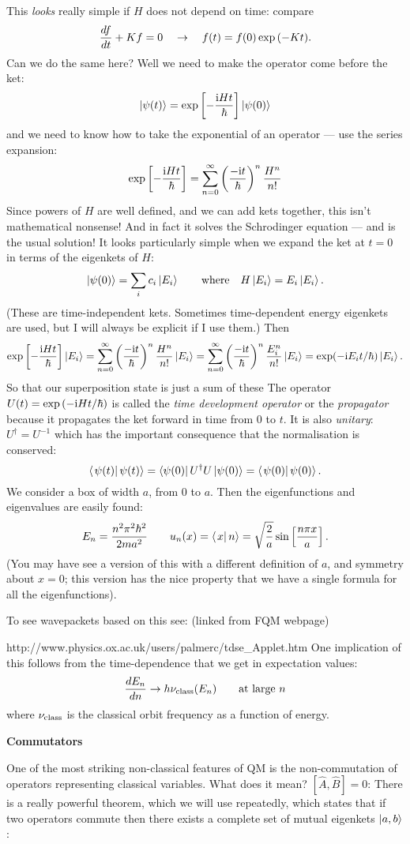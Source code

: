 \noi
This {\it looks} really simple if $H$ does not depend on
time: compare
$$
{df\over dt} + K f=0\quad\to\quad f(t)=f(0)\exp{(-Kt)}.
$$
Can we do the same here? Well we need to make the operator come before the ket:
$$
\left| {\psi(t)} \right>=\exp{\left[-{{\rm i}Ht\over\hbar}\right]}\left| {\psi(0)} \right>
$$
and we need to know how to take the exponential of an operator --- use the
series expansion:
$$
\exp{\left[-{{\rm i}Ht\over\hbar}\right]}=\sum_{n=0}^\infty\left({-{\rm i}
t\over\hbar}\right)^n{H^n\over n!}
$$
Since powers of $H$ are well defined, and we can add kets together, this isn't
mathematical nonsense! And in fact it solves the Schrodinger equation --- and
is the usual solution!
\vfil\Eject
{}
\noi It looks particularly simple when we expand the ket at $t=0$ in
terms of the eigenkets of $H$: 
$$
\left| {\psi(0)} \right>=\sum_ic_i\left| {E_i} \right>\qquad\hbox{where} \quad
H\left| {E_i} \right>=E_i\left| {E_i} \right>.
$$
(These are time-independent kets. Sometimes time-dependent energy eigenkets 
are used, but I will always be explicit if I use them.) Then
$$
\exp{\left[-{{\rm i}Ht\over\hbar}\right]}\left| {E_i} \right>=\sum_{n=0}^\infty\left({-{\rm i}
t\over\hbar}\right)^n{H^n\over n!}\left| {E_i} \right>=\sum_{n=0}^\infty\left({-{\rm i}
t\over\hbar}\right)^n{E_i^n\over n!}\left| {E_i} \right>=\exp(-{\rm i} E_it/\hbar)\left| {E_i} \right>.
$$
So that our superposition state is just a sum of these
\noi The operator $U(t)=\exp{(-{\rm i}Ht/\hbar)}$ is called the {\it time development
operator} or the {\it propagator} because it propagates the ket forward in
time from $0$ to $t$.  It is also {\it unitary}: $U^{\dag}=U^{-1}$ which has the
important consequence that the normalisation is conserved:
$$
\left< \left. {\psi(t)} \right| {\psi(t)} \right>=\left< {\psi(0)} \right|U^{\dag}U\left| {\psi(0)} \right>=\left< \left. {\psi(0)} \right| {\psi(0)} \right>.
$$
\vfil\Eject
{}
We consider a box of width $a$, from $0$ to $a$. Then the eigenfunctions and
eigenvalues are easily found:
$$
E_n={n^2 \pi^2\hbar^2\over 2 m a^2}\qquad u_n(x)=\left< \left. {x} \right| {n} \right>=\sqrt{2\over
a}\sin\left[{n\pi x\over a}\right].
$$
(You may have see a version of this with a different definition of $a$, and
symmetry about $x=0$; this version has the nice property that we have a single
formula for all the eigenfunctions).

To see wavepackets based on this see: (linked from FQM webpage)

http://www.physics.ox.ac.uk/users/palmerc/tdse\_Applet.htm
\vfil
{} One implication of this follows from
the time-dependence that we get in expectation values:
$$
{dE_n\over dn}\to h\nu_{\rm class}(E_n)\qquad\hbox{at large $n$}
$$
where $\nu_{\rm class}$ is the classical orbit frequency as a function of energy.
\vfil\Eject
{}
\centerline{\bf Commutators}
\noi One of the most striking non-classical features of QM is the
non-commutation of operators representing classical variables. What does it
mean?
\smallskip
$[\hat A,\hat B]=0$: There is a really powerful theorem, which we will use
repeatedly, which states that if two operators commute then there exists a
complete set of mutual eigenkets $\left| {a,b} \right>$:

